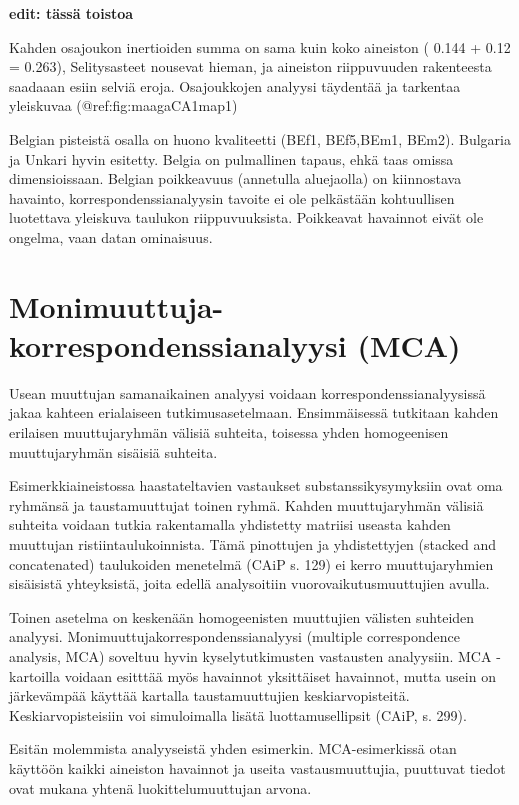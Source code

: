 \documentclass[
  finnish,
]{book}
\begin{document}
\textbf{edit: tässä toistoa}

Kahden osajoukon inertioiden summa on sama kuin koko aineiston
( 0.144 + 0.12 = 0.263), Selitysasteet
nousevat hieman, ja aineiston riippuvuuden rakenteesta saadaaan esiin selviä eroja.
Osajoukkojen analyysi täydentää ja tarkentaa yleiskuvaa (@ref:fig:maagaCA1map1)

Belgian pisteistä osalla on huono kvaliteetti (BEf1, BEf5,BEm1, BEm2). Bulgaria ja
Unkari hyvin esitetty. Belgia on pulmallinen tapaus, ehkä taas omissa dimensioissaan.
Belgian poikkeavuus (annetulla aluejaolla) on kiinnostava havainto, korrespondenssianalyysin
tavoite ei ole pelkästään kohtuullisen luotettava yleiskuva taulukon riippuvuuksista. Poikkeavat
havainnot eivät ole ongelma, vaan datan ominaisuus.

\hypertarget{monimuuttuja-korrespondenssianalyysi-mca}{%
\chapter{Monimuuttuja-korrespondenssianalyysi (MCA)}\label{monimuuttuja-korrespondenssianalyysi-mca}}

Usean muuttujan samanaikainen analyysi voidaan korrespondenssianalyysissä
jakaa kahteen erialaiseen tutkimusasetelmaan. Ensimmäisessä tutkitaan kahden
erilaisen muuttujaryhmän välisiä suhteita, toisessa yhden homogeenisen
muuttujaryhmän sisäisiä suhteita.

Esimerkkiaineistossa haastateltavien
vastaukset substanssikysymyksiin ovat oma ryhmänsä ja taustamuuttujat toinen
ryhmä. Kahden muuttujaryhmän välisiä suhteita voidaan tutkia rakentamalla yhdistetty matriisi useasta kahden muuttujan ristiintaulukoinnista.
Tämä pinottujen ja yhdistettyjen (stacked and concatenated) taulukoiden
menetelmä (CAiP s. 129) ei kerro muuttujaryhmien sisäisistä yhteyksistä,
joita edellä analysoitiin vuorovaikutusmuuttujien avulla.

Toinen asetelma on keskenään homogeenisten muuttujien välisten suhteiden analyysi.
Monimuuttujakorrespondenssianalyysi (multiple correspondence analysis, MCA)
soveltuu hyvin kyselytutkimusten vastausten analyysiin. MCA - kartoilla voidaan
esitttää myös havainnot yksittäiset havainnot, mutta usein on järkevämpää
käyttää kartalla taustamuuttujien keskiarvopisteitä. Keskiarvopisteisiin voi simuloimalla lisätä
luottamusellipsit (CAiP, s. 299).

Esitän molemmista analyyseistä yhden esimerkin. MCA-esimerkissä otan käyttöön
kaikki aineiston havainnot ja useita vastausmuuttujia, puuttuvat tiedot ovat
mukana yhtenä luokittelumuuttujan arvona.
\end{document}
